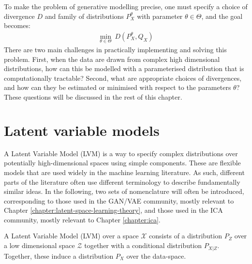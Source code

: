 To make the problem of generative modelling precise, one must specify a choice of divergence
$D$ and family of distributions $P_X^\theta$ with parameter $\theta\in\Theta$, and the goal becomes:
%
\begin{align*}
\min_{\theta \in \Theta} \ D\left(P_X^\theta,  Q_X \right)
\end{align*}
%
There are two main challenges in practically implementing and solving this problem.
First, when the data are drawn from complex high dimensional distributions, how can this be modelled with a parameterised distribution that is computationally tractable?
Second, what are appropriate choices of divergences, and how can they be estimated or minimised with respect to the parameters $\theta$?
These questions will be discussed in the rest of this chapter. 



\section{Latent variable models}

A Latent Variable Model (LVM) is a way to specify complex distributions over potentially high-dimensional spaces using simple components. 
These are flexible models that are used widely in the machine learning literature. 
As such, different parts of the literature often use different terminology to describe fundamentally similar ideas. 
In the following, two sets of nomenclature will often be introduced, corresponding to those used in the GAN/VAE community, mostly relevant to Chapter \ref{chapter:latent-space-learning-theory}, and those used in the ICA community, mostly relevant to Chapter \ref{chapter:ica}.

\medskip

\begin{definition}
A Latent Variable Model (LVM) over a space $\mathcal{X}$ consists of a distribution $P_Z$ over a low dimensional space $\mathcal{Z}$ together with a conditional distribution $P_{X|Z}$. 
Together, these induce a distribution $P_X$ over the data-space. 
\end{definition}

